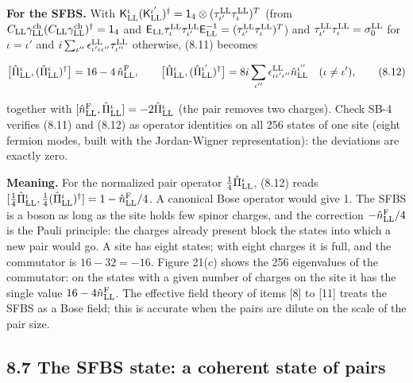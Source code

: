 \documentclass[
  10pt,
]{article}
\begin{document}
\textbf{For the SFBS.} With
\(\mathsf K^\iota_{\rm LL}(\mathsf K^{\iota'}_{\rm LL})^\dagger=\mathsf 1_4\otimes(\tau^{\rm LL}_{\iota'}\tau^{\rm LL}_\iota)^T\)
(from
\(C_{\rm LL}\gamma^{\rm ch}_{\rm LL}(C_{\rm LL}\gamma^{\rm ch}_{\rm LL})^\dagger=\mathsf 1_4\)
and
\(\mathsf E_{\rm LL}\tau^{\rm LL}_\iota\tau^{\rm LL}_{\iota'}\mathsf E^{-1}_{\rm LL}=(\tau^{\rm LL}_{\iota'}\tau^{\rm LL}_\iota)^T\))
and \(\tau^{\rm LL}_{\iota'}\tau^{\rm LL}_\iota=\sigma^{\rm LL}_0\) for
\(\iota=\iota'\) and
\(i\sum_{\iota''}\epsilon^{\rm LL}_{\iota'\iota\iota''}\tau^{\rm LL}_{\iota''}\)
otherwise, (8.11) becomes

\[\big[\hat\Pi^\iota_{\rm LL},(\hat\Pi^\iota_{\rm LL})^\dagger\big]=16-4\,\hat n^{\rm F}_{\rm LL},\qquad\big[\hat\Pi^\iota_{\rm LL},(\hat\Pi^{\iota'}_{\rm LL})^\dagger\big]=8i\sum_{\iota''}\epsilon^{\rm LL}_{\iota\iota'\iota''}\hat n^{\iota''}_{\rm LL}\quad(\iota\neq\iota'),\tag{8.12}\]

together with
\([\hat n^{\rm F}_{\rm LL},\hat\Pi^\iota_{\rm LL}]=-2\hat\Pi^\iota_{\rm LL}\)
(the pair removes two charges). Check SB-4 verifies (8.11) and (8.12) as
operator identities on all 256 states of one site (eight fermion modes,
built with the Jordan-Wigner representation): the deviations are exactly
zero.

\textbf{Meaning.} For the normalized pair operator
\(\tfrac14\hat\Pi^\iota_{\rm LL}\), (8.12) reads
\([\tfrac14\hat\Pi^\iota_{\rm LL},\tfrac14(\hat\Pi^\iota_{\rm LL})^\dagger]=1-\hat n^{\rm F}_{\rm LL}/4\).
A canonical Bose operator would give 1. The SFBS is a boson as long as
the site holds few spinor charges, and the correction
\(-\hat n^{\rm F}_{\rm LL}/4\) is the Pauli principle: the charges
already present block the states into which a new pair would go. A site
has eight states; with eight charges it is full, and the commutator is
\(16-32=-16\). Figure 21(c) shows the 256 eigenvalues of the commutator:
on the states with a given number of charges on the site it has the
single value \(16-4\hat n^{\rm F}_{\rm LL}\). The effective field theory
of items {[}8{]} to {[}11{]} treats the SFBS as a Bose field; this is
accurate when the pairs are dilute on the scale of the pair size.

\hypertarget{the-sfbs-state-a-coherent-state-of-pairs}{%
\subsection{8.7 The SFBS state: a coherent state of
pairs}\label{the-sfbs-state-a-coherent-state-of-pairs}}
\end{document}
